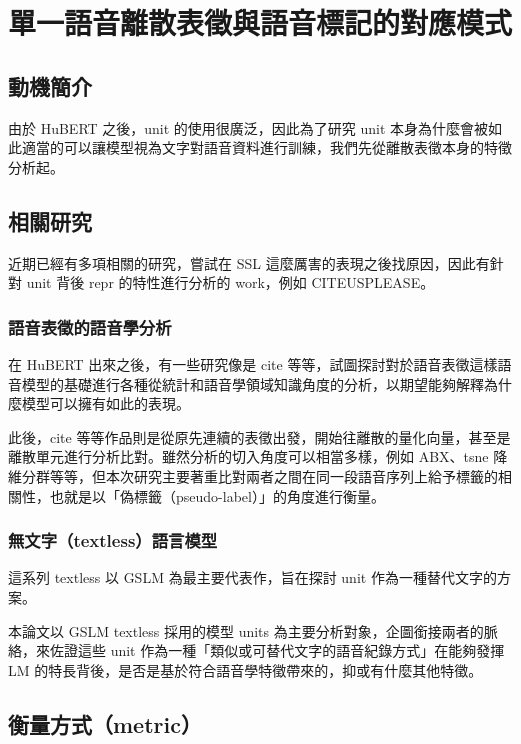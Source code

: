 \chapter{單一語音離散表徵與語音標記的對應模式}  %

\section{動機簡介}  %

由於 HuBERT 之後，unit 的使用很廣泛，因此為了研究 unit 本身為什麼會被如此適當的可以讓模型視為文字對語音資料進行訓練，我們先從離散表徵本身的特徵分析起。 

\section{相關研究}
近期已經有多項相關的研究，嘗試在 SSL 這麼厲害的表現之後找原因，因此有針對 unit 背後 repr 的特性進行分析的 work，例如 CITEUSPLEASE。 

\subsection{語音表徵的語音學分析}
在 HuBERT 出來之後，有一些研究像是 cite 等等，試圖探討對於語音表徵這樣語音模型的基礎進行各種從統計和語音學領域知識角度的分析，以期望能夠解釋為什麼模型可以擁有如此的表現。

此後，cite 等等作品則是從原先連續的表徵出發，開始往離散的量化向量，甚至是離散單元進行分析比對。雖然分析的切入角度可以相當多樣，例如 ABX、tsne 降維分群等等，但本次研究主要著重比對兩者之間在同一段語音序列上給予標籤的相關性，也就是以「偽標籤（pseudo-label）」的角度進行衡量。

\subsection{無文字（textless）語言模型}

這系列 textless 以 GSLM 為最主要代表作，旨在探討 unit 作為一種替代文字的方案。

本論文以 GSLM textless 採用的模型 units 為主要分析對象，企圖銜接兩者的脈絡，來佐證這些 unit 作為一種「類似或可替代文字的語音紀錄方式」在能夠發揮 LM 的特長背後，是否是基於符合語音學特徵帶來的，抑或有什麼其他特徵。

\section{衡量方式（metric）}


